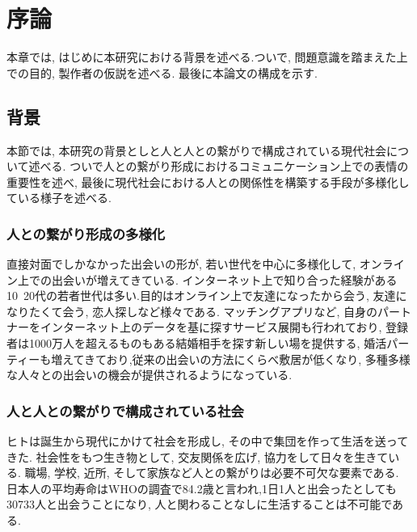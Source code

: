 \chapter{序論}
\label{chap:introduction}

本章では, はじめに本研究における背景を述べる.ついで, 問題意識を踏まえた上での目的, 製作者の仮説を述べる. 最後に本論文の構成を示す.

\section{背景}
本節では, 本研究の背景としと人と人との繋がりで構成されている現代社会について述べる. ついで人との繋がり形成におけるコミュニケーション上での表情の重要性を述べ, 最後に現代社会における人との関係性を構築する手段が多様化している様子を述べる.


\subsection{人との繋がり形成の多様化}
直接対面でしかなかった出会いの形が, 若い世代を中心に多様化して, オンライン上での出会いが増えてきている. インターネット上で知り合った経験がある10~20代の若者世代は多い.\cite{mandom}目的はオンライン上で友達になったから会う, 友達になりたくて会う, 恋人探しなど様々である.
マッチングアプリなど, 自身のパートナーをインターネット上のデータを基に探すサービス展開も行われており, 登録者は1000万人を超えるものもある結婚相手を探す新しい場を提供する, 婚活パーティーも増えてきており\cite{chane_claire},従来の出会いの方法にくらべ敷居が低くなり, 多種多様な人々との出会いの機会が提供されるようになっている.


\subsection{人と人との繋がりで構成されている社会}
ヒトは誕生から現代にかけて社会を形成し, その中で集団を作って生活を送ってきた. 社会性をもつ生き物として, 交友関係を広げ, 協力をして日々を生きている. 職場, 学校, 近所, そして家族など人との繋がりは必要不可欠な要素である. 日本人の平均寿命はWHOの調査で84.2歳\cite{WHO_reserch}と言われ,1日1人と出会ったとしても30733人と出会うことになり, 人と関わることなしに生活することは不可能である.


